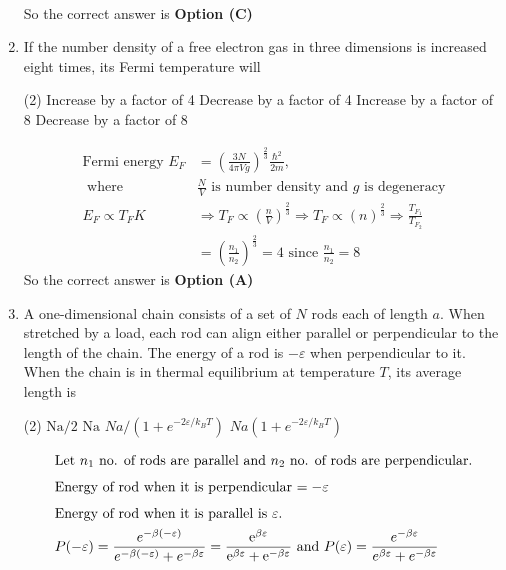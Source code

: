 \begin{enumerate}
\begin{answer}
\begin{align*}
\end{align*}
So the correct answer is \textbf{Option (C)}	
\end{answer}
\item If the number density of a free electron gas in three dimensions is increased eight times, its Fermi temperature will
{}
\begin{tasks}(2)
\task[\textbf{A.}] Increase by a factor of 4
\task[\textbf{B.}] Decrease by a factor of 4
\task[\textbf{C.}] Increase by a factor of 8
\task[\textbf{D.}] Decrease by a factor of 8
\end{tasks}
\begin{answer}
\begin{align*}
\text{Fermi energy }E_{F}&=\left(\frac{3 N}{4 \pi V g}\right)^{\frac{2}{3}} \frac{\hbar^{2}}{2 m},\\\text{ where }&\frac{N}{V}\text{ is number density and $g$ is degeneracy}\\
E_{F} \propto T_{F} K &\Rightarrow T_{F} \propto\left(\frac{n}{V}\right)^{\frac{2}{3}} \Rightarrow T_{F} \propto(n)^{\frac{2}{3}} \Rightarrow \frac{T_{F_{1}}}{T_{F_{2}}}\\&=\left(\frac{n_{1}}{n_{2}}\right)^{\frac{2}{3}}=4\text{ since } \frac{n_{1}}{n_{2}}=8
\end{align*}
So the correct answer is \textbf{Option (A)}
\end{answer}
\item A one-dimensional chain consists of a set of $N$ rods each of length $a$. When stretched by a load, each rod can align either parallel or perpendicular to the length of the chain. The energy of a rod is $-\varepsilon$ when perpendicular to it. When the chain is in thermal equilibrium at temperature $T$, its average length is
{}
\begin{tasks}(2)
\task[\textbf{A.}] $\mathrm{Na} / 2$
\task[\textbf{B.}] $\mathrm{Na}$
\task[\textbf{C.}] $N a /\left(1+e^{-2 \varepsilon / k_{B} T}\right)$
\task[\textbf{D.}] $N a\left(1+e^{-2 \varepsilon / k_{B} T}\right)$
\end{tasks}
\begin{answer}
\begin{align*}
\intertext{Let $n_{1}$ no. of rods are parallel and $n_{2}$ no. of rods are perpendicular.}
\intertext{Energy of rod when it is perpendicular $=-\varepsilon$}
\intertext{Energy of rod when it is parallel is $\varepsilon$.}
P(-\varepsilon)&=\frac{e^{-\beta(-\varepsilon)}}{e^{-\beta(-\varepsilon)}+e^{-\beta \varepsilon}}=\frac{\mathrm{e}^{\beta \varepsilon}}{\mathrm{e}^{\beta \varepsilon}+\mathrm{e}^{-\beta \varepsilon}}\text{ and }P(\varepsilon)=\frac{e^{-\beta \varepsilon}}{e^{\beta \varepsilon}+e^{-\beta \varepsilon}}\\

\end{align*}
\end{answer}
\end{enumerate}
